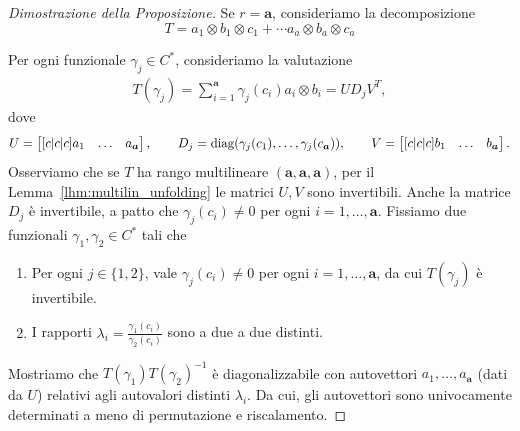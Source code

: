 \begin{proof}[Dimostrazione della Proposizione]
	Se $ r = \bm{a} $, consideriamo la decomposizione
	\begin{equation*}
		T = a_1 \otimes b_1 \otimes c_1 + \cdots a_{a} \otimes b_{a} \otimes c_{a}
	\end{equation*}

	Per ogni funzionale $ \gamma_{j} \in C^* $, consideriamo la valutazione
	\begin{equation*}
		\begin{aligned}
			T(\gamma_{j}) = \sum_{i = 1}^{\bm{a}} \gamma_{j}(c_{i})a_{i} \otimes b_{i}
			= UD_{j}V^T,
		\end{aligned}
	\end{equation*}
	dove
	\begin{equation*}
		U =  \begin{bmatrix}[c|c|c]
			a_1 & \dots & a_{\bm{a}}
		\end{bmatrix}, \qquad
		D_{j} = \operatorname{diag}(\gamma_{j}(c_1), \ldots, \gamma_{j}(c_{\bm{a}})), \qquad
		V = \begin{bmatrix}[c|c|c]
			b_1 & \dots & b_{\bm{a}}
		\end{bmatrix}.
	\end{equation*}
	Osserviamo che se $ T $ ha rango multilineare $ (\bm{a}, \bm{a}, \bm{a}) $, per il Lemma~\ref{lhm:multilin_unfolding} le matrici $ U,V $
	sono invertibili. Anche la matrice $ D_{j} $ è invertibile, a patto che $ \gamma_{j}(c_{i}) \neq 0 $ per ogni $ i = 1
		, \ldots, \bm{a}$. Fissiamo due funzionali $ \gamma_1,\gamma_2 \in C^* $ tali che
	\begin{enumerate}[label=(\roman*)]
		\item Per ogni $ j \in \{1,2\} $, vale $ \gamma_{j}(c_{i}) \neq 0 $ per ogni $ i = 1, \ldots, \bm{a}  $, da
		      cui $ T(\gamma_{j}) $ è invertibile.
		\item I rapporti $ \lambda_{i} = \frac{\gamma_1(c_{i})}{\gamma_2(c_{i})}$ sono a due a due
		      distinti.
	\end{enumerate}
	Mostriamo che $ T(\gamma_1)T(\gamma_2)^{-1} $ è diagonalizzabile con autovettori $ a_1, \ldots,
		a_{\bm{a}} $ (dati da $ U $) relativi agli autovalori distinti $ \lambda_{i} $. Da cui, gli
	autovettori sono univocamente determinati a meno di permutazione e riscalamento.


\end{proof}
